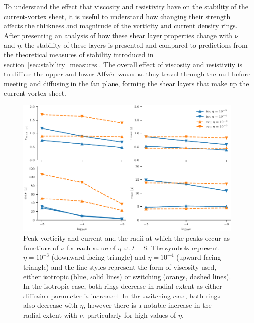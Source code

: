 To understand the effect that viscosity and resistivity have on the stability of the current-vortex sheet, it is useful to understand how changing their strength affects the thickness and magnitude of the vorticity and current density rings. After presenting an analysis of how these shear layer properties change with $\nu$ and $\eta$, the stability of these layers is presented and compared to predictions from the theoretical measures of stability introduced in section~\ref{sec:stability_measures}. The overall effect of viscosity and resistivity is to diffuse the upper and lower Alfv\'en waves as they travel through the null before meeting and diffusing in the fan plane, forming the shear layers that make up the current-vortex sheet. 

\begin{figure}[h]
  \centering
  \includegraphics[width=\linewidth]{param_study/peak_mag_and_loc.pdf}
  \caption{Peak vorticity and current and the radii at which the peaks occur as functions of $\nu$ for each value of $\eta$ at $t=8$. The symbols represent $\eta=10^{-3}$ (downward-facing triangle) and $\eta=10^{-4}$ (upward-facing triangle) and the line styles represent the form of viscosity used, either isotropic (blue, solid lines) or switching (orange, dashed lines). In the isotropic case, both rings decrease in radial extent as either diffusion parameter is increased. In the switching case, both rings also decrease with $\eta$, however there is a notable increase in the radial extent with $\nu$, particularly for high values of $\eta$.}%
  \label{fig:param_study_peak_mag_and_loc}
\end{figure}

